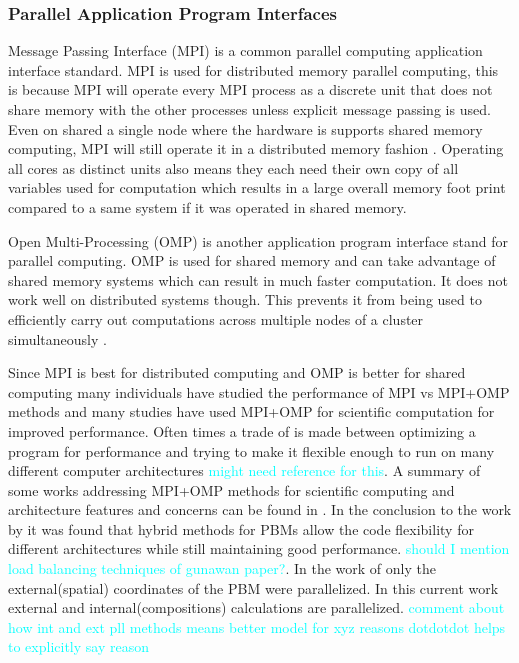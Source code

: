 \documentclass[preprint,11pt,authoryear]{elsarticle}
\begin{document}
	    \subsubsection{Parallel Application Program Interfaces}
	    \par Message Passing Interface (MPI) is a common parallel computing application interface standard. MPI is used for distributed memory parallel computing, this is because MPI will operate every MPI process as a discrete unit that does not share memory with the other processes unless explicit message passing is used. Even on shared a single node where the hardware is supports shared memory computing, MPI will still operate it in a distributed memory fashion \cite{Jin2011}. Operating all cores as distinct units also means they each need their own copy of all variables used for computation which results in a large overall memory foot print compared to a same system if it was operated in shared memory. 
	    \par Open Multi-Processing (OMP) is another application program interface stand for parallel computing. OMP is used for shared memory and can take advantage of shared memory systems which can result in much faster computation. It does not work well on distributed systems though. This prevents it from being used to efficiently carry out computations across multiple nodes of a cluster simultaneously \cite{Jin2011}. 
	    \par Since MPI is best for distributed computing and OMP is better for shared computing many individuals have studied the performance of MPI vs MPI+OMP methods and many studies have used MPI+OMP for scientific computation for improved performance. Often times a trade of is made between optimizing a program for performance and trying to make it flexible enough to run on many different computer architectures \textcolor{cyan}{might need reference for this}. A summary of some works addressing MPI+OMP methods for scientific computing and architecture features and concerns can be found in \cite{Bettencourt2017}. In the conclusion to the work by \cite{Bettencourt2017} it was found that hybrid methods for PBMs allow the code flexibility for different architectures while still maintaining good performance. \textcolor{cyan}{should I mention load balancing techniques of gunawan paper?}. In the work of \cite{Bettencourt2017} only the external(spatial) coordinates of the PBM were parallelized. In this current work external and internal(compositions) calculations are parallelized. \textcolor{cyan}{comment about how int and ext pll methods means better model for xyz reasons dotdotdot helps to explicitly say reason} 
	      
\end{document}
